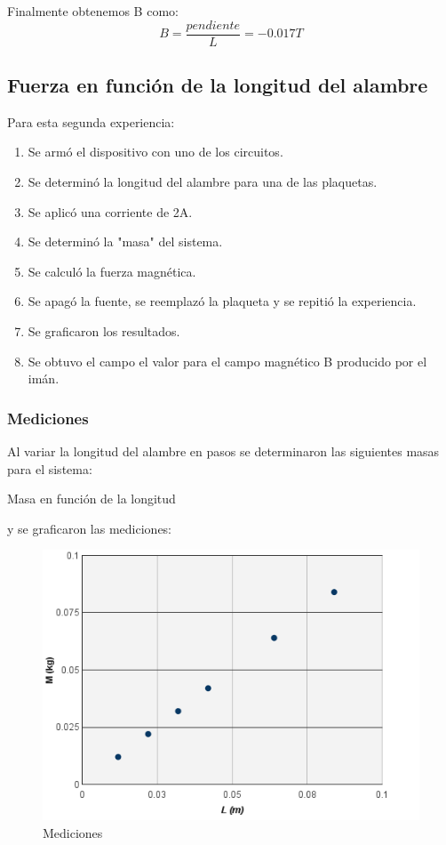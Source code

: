 \documentclass{article}
\begin{document}
Finalmente obtenemos B como:
\begin{equation}
B = \frac{pendiente}{L} = -0.017 T
\end{equation}

\subsection{Fuerza en función de la longitud del alambre}
Para esta segunda experiencia:

\begin{enumerate}
  \item Se armó el dispositivo con uno de los circuitos.
  \item Se determinó la longitud del alambre para una de las plaquetas.
  \item Se aplicó una corriente de 2A.
  \item Se determinó la "masa" del sistema.
  \item Se calculó la fuerza magnética.
  \item Se apagó la fuente, se reemplazó la plaqueta y se repitió la experiencia. 
  \item Se graficaron los resultados.
  \item Se obtuvo el campo el valor para el campo magnético B producido por el imán.
\end{enumerate}
\subsubsection{Mediciones}

Al variar la longitud del alambre en pasos se determinaron las siguientes masas para el sistema:

\begin{table}[H]
\centering

\caption{Masa en función de la longitud}
\label{tab:segunda_experiencia}
\end{table}

y se graficaron las mediciones:

\begin{figure}[H]
\centering
\includegraphics[width=\textwidth]{mediciones_segunda_experiencia.png}
\caption{Mediciones}
\label{fig:mediciones_segunda_experiencia}
\end{figure}
\end{document}
